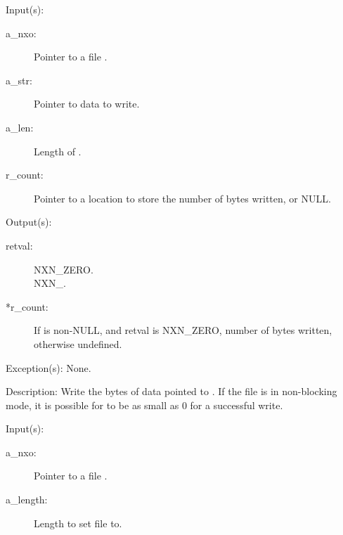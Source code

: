 \begin{capi}
\label{nxo_file_write}
	\begin{capilist}
	\item[Input(s): ]
		\begin{description}\item[]
		\item[a\_nxo: ]
			Pointer to a file .
		\item[a\_str: ]
			Pointer to data to write.
		\item[a\_len: ]
			Length of .
		\item[r\_count: ]
			Pointer to a location to store the number of bytes
			written, or NULL.
		\end{description}
	\item[Output(s): ]
		\begin{description}\item[]
		\item[retval: ]
			\begin{description}\item[]
			\item[NXN\_ZERO.]
			\item[NXN\_.]
			\end{description}
		\item[*r\_count: ]
			If  is non-NULL, and retval is NXN\_ZERO,
			number of bytes written, otherwise undefined.
		\end{description}
	\item[Exception(s): ] None.
	\item[Description: ]
		Write the  bytes of data pointed to .
		If the file is in non-blocking mode, it is possible for
		 to be as small as 0 for a successful write.
	\end{capilist}
\label{nxo_file_truncate}
	\begin{capilist}
	\item[Input(s): ]
		\begin{description}\item[]
		\item[a\_nxo: ]
			Pointer to a file \classname{nxo}.
		\item[a\_length: ]
			Length to set file to.

\end{description}
\end{capilist}
\end{capi}
